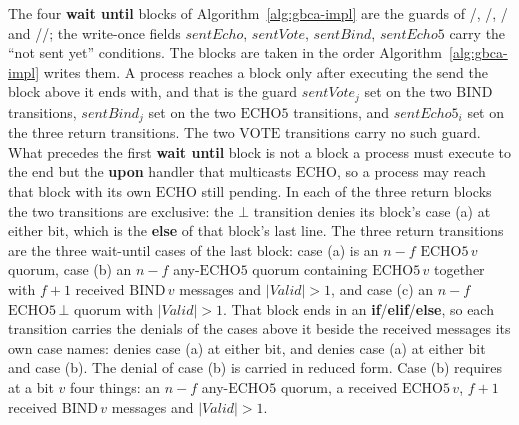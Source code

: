 The four \textbf{wait until} blocks of Algorithm~\ref{alg:gbca-impl} are the guards of /\allowbreak{},
/\allowbreak{},
/\allowbreak{} and
/\allowbreak{}/\allowbreak{}; the write-once fields
$\mathit{sentEcho}$, $\mathit{sentVote}$, $\mathit{sentBind}$, $\mathit{sentEcho5}$ carry the ``not sent yet'' conditions.
The blocks are taken in the order Algorithm~\ref{alg:gbca-impl} writes them.
A process reaches a block only after executing the send the block above it ends with, and that is the guard $\mathit{sentVote}_j$ set on the two $\mathrm{BIND}$ transitions, $\mathit{sentBind}_j$ set on the two $\mathrm{ECHO5}$ transitions, and $\mathit{sentEcho5}_i$ set on the three return transitions.
The two $\mathrm{VOTE}$ transitions carry no such guard.
What precedes the first \textbf{wait until} block is not a block a process must execute to the end but the \textbf{upon} handler that multicasts $\mathrm{ECHO}$, so a process may reach that block with its own $\mathrm{ECHO}$ still pending.
In each of the three return blocks the two transitions are exclusive: the $\bot$ transition denies its block's case (a) at either bit, which is the \textbf{else} of that block's last line.
The three return transitions are the three wait-until cases of the last block: case (a) is an $n{-}f$ $\mathrm{ECHO5}\,v$ quorum, case (b) an $n{-}f$ any-$\mathrm{ECHO5}$ quorum containing $\mathrm{ECHO5}\,v$ together with $f{+}1$ received $\mathrm{BIND}\,v$ messages and $|\mathit{Valid}| > 1$, and case (c) an $n{-}f$ $\mathrm{ECHO5}\,\bot$ quorum with $|\mathit{Valid}| > 1$.
That block ends in an \textbf{if}/\textbf{elif}/\textbf{else}, so each transition carries the denials of the cases above it beside the received messages its own case names:  denies case (a) at either bit, and  denies case (a) at either bit and case (b).
The denial of case (b) is carried in reduced form.
Case (b) requires at a bit $v$ four things: an $n{-}f$ any-$\mathrm{ECHO5}$ quorum, a received $\mathrm{ECHO5}\,v$, $f{+}1$ received $\mathrm{BIND}\,v$ messages and $|\mathit{Valid}| > 1$.
